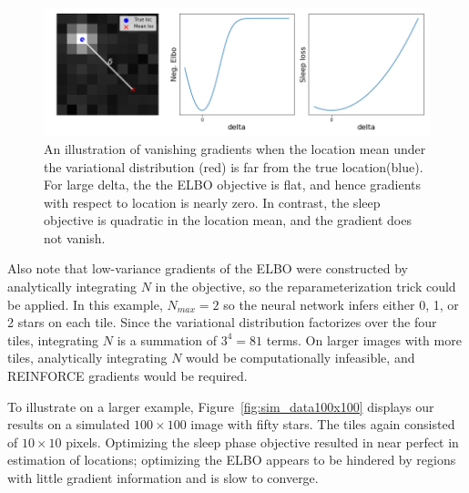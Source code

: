 \begin{figure}[!htb]
    \centering
    \includegraphics[width=\textwidth]{figures/gradzero_cartoon3.png}
    \caption{An illustration of vanishing gradients when the location mean under the variational distribution (red) is far from the true location(blue). 
    For large delta, the the ELBO objective is flat, 
    and hence gradients with respect to location is nearly zero. 
    In contrast, the sleep objective is quadratic in the location mean, and the gradient does not vanish. }
    \label{fig:gradzero_cartoon}
\end{figure}

Also note that low-variance gradients of the ELBO were constructed by analytically integrating $N$ in the objective, so the reparameterization trick could be applied. 
In this example, $N_{max} = 2$ so the neural network infers either 0, 1, or 2 stars on each tile. 
Since the variational distribution factorizes over the four tiles, integrating $N$ is a summation of $3^4 = 81$ terms.
On larger images with more tiles, analytically integrating $N$ would be computationally infeasible, and REINFORCE gradients would be required. 

To illustrate on a larger example, Figure~\ref{fig:sim_data100x100} displays our results on a simulated $100\times 100$ image with fifty stars. The tiles again consisted of $10\times 10$ pixels. Optimizing the sleep phase objective resulted in near perfect in estimation of locations; optimizing the ELBO appears to be hindered by regions with little gradient information and is slow to converge. 

